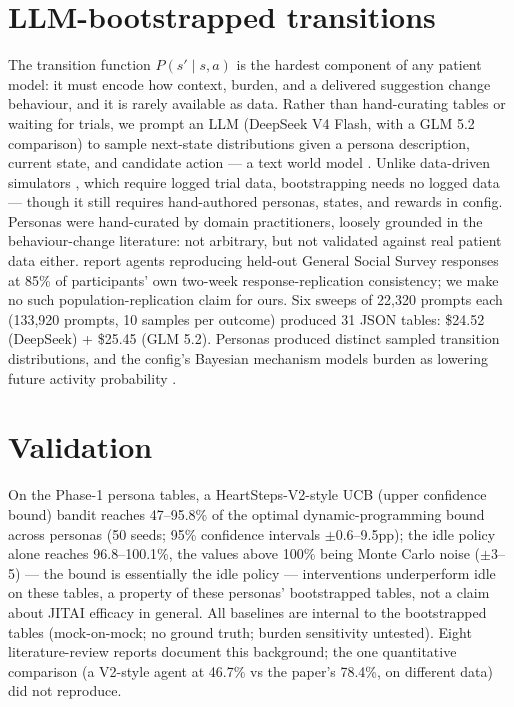 \documentclass[11pt,a4paper]{article}
\begin{document}
\section{LLM-bootstrapped transitions}
The transition function $P(s' \mid s, a)$ is the hardest component of any
patient model: it must encode how context, burden, and a delivered suggestion
change behaviour, and it is rarely available as data. Rather than hand-curating
tables or waiting for trials, we prompt an LLM (DeepSeek V4 Flash, with a GLM
5.2 comparison) to sample
next-state distributions given a persona description, current state, and
candidate action --- a text world model \cite{liwang2026textworld}. Unlike
data-driven simulators \cite{wang2021optimizing}, which require logged trial
data, bootstrapping needs
no logged data --- though it still requires hand-authored personas, states, and
rewards in config. Personas were hand-curated by domain practitioners, loosely
grounded in the behaviour-change literature: not arbitrary, but not validated
against real patient data either. \citet{park2024thousandpeople} report agents reproducing held-out
General Social Survey responses at 85\% of participants' own two-week response-replication
consistency; we make no such population-replication claim for ours. Six sweeps of 22{,}320 prompts each (133{,}920 prompts, 10 samples
per outcome) produced 31 JSON tables: \$24.52 (DeepSeek) + \$25.45 (GLM 5.2).
Personas produced distinct sampled transition distributions, and the config's
Bayesian mechanism models burden as lowering future activity probability
\cite{park2023generative,wang2021optimizing}.

\section{Validation}
On the Phase-1 persona tables, a HeartSteps-V2-style UCB (upper confidence
bound) bandit reaches 47--95.8\%
of the optimal dynamic-programming bound across personas (50 seeds; 95\%
confidence intervals $\pm$0.6--9.5pp);
the idle policy alone reaches 96.8--100.1\%, the values above 100\% being
Monte Carlo noise ($\pm$3--5) --- the bound is essentially the idle policy ---
interventions underperform idle on these tables, a property of these personas'
bootstrapped tables, not a claim about JITAI efficacy in general.
All baselines are internal to the bootstrapped tables (mock-on-mock;
no ground truth; burden sensitivity untested). Eight literature-review reports
document this background; the one quantitative comparison (a V2-style agent at
46.7\% vs the paper's 78.4\%, on different data) did not reproduce.
\end{document}
